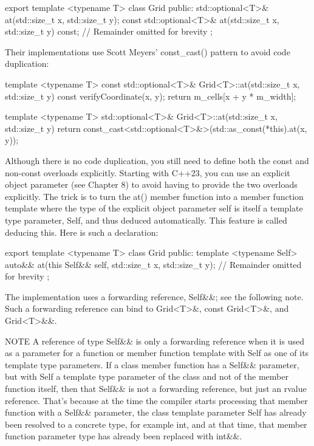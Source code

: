 \begin{cpp}
export template <typename T>
class Grid
{
    public:
        std::optional<T>& at(std::size_t x, std::size_t y);
        const std::optional<T>& at(std::size_t x, std::size_t y) const;
        // Remainder omitted for brevity
};
\end{cpp}

Their implementations use Scott Meyers’ const\_cast() pattern to avoid code duplication:

\begin{cpp}
template <typename T>
const std::optional<T>& Grid<T>::at(std::size_t x, std::size_t y) const
{
    verifyCoordinate(x, y);
    return m_cells[x + y * m_width];
}

template <typename T>
std::optional<T>& Grid<T>::at(std::size_t x, std::size_t y)
{
    return const_cast<std::optional<T>&>(std::as_const(*this).at(x, y));
}
\end{cpp}

Although there is no code duplication, you still need to define both the const and non-const overloads explicitly. Starting with C++23, you can use an explicit object parameter (see Chapter 8) to avoid having to provide the two overloads explicitly. The trick is to turn the at() member function into a member function template where the type of the explicit object parameter self is itself a template type parameter, Self, and thus deduced automatically. This feature is called deducing this. Here is such a declaration:

\begin{cpp}
export template <typename T>
class Grid
{
    public:
        template <typename Self>
        auto&& at(this Self&& self, std::size_t x, std::size_t y);
        // Remainder omitted for brevity
};
\end{cpp}

The implementation uses a forwarding reference, Self\&\&; see the following note. Such a forwarding reference can bind to Grid<T>\&, const Grid<T>\&, and Grid<T>\&\&.

\begin{myNotic}{NOTE}
A reference of type Self\&\& is only a forwarding reference when it is used as a parameter for a function or member function template with Self as one of its template type parameters. If a class member function has a Self\&\& parameter, but with Self a template type parameter of the class and not of the member function itself, then that Self\&\& is not a forwarding reference, but just an rvalue reference. That’s because at the time the compiler starts processing that member function with a Self\&\& parameter, the class template parameter Self has already been resolved to a concrete type, for example int, and at that time, that member function parameter type has already been replaced with int\&\&.
\end{myNotic}

